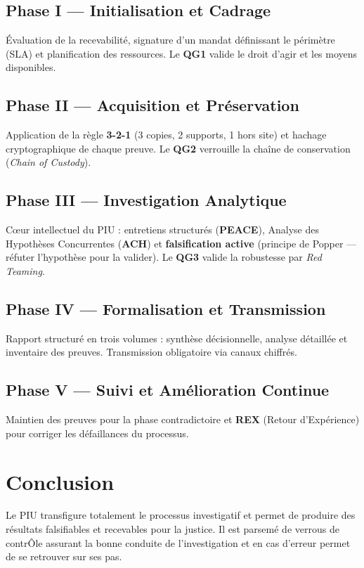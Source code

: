 \subsection{Phase I — Initialisation et Cadrage}
Évaluation de la recevabilité, signature d'un mandat définissant le périmètre (SLA) et planification des ressources. Le \textbf{QG1} valide le droit d'agir et les moyens disponibles.

\subsection{Phase II — Acquisition et Préservation}
Application de la règle \textbf{3-2-1} (3 copies, 2 supports, 1 hors site) et hachage cryptographique de chaque preuve. Le \textbf{QG2} verrouille la chaîne de conservation (\textit{Chain of Custody}).

\subsection{Phase III — Investigation Analytique}
Cœur intellectuel du PIU : entretiens structurés (\textbf{PEACE}), Analyse des Hypothèses Concurrentes (\textbf{ACH}) et \textbf{falsification active} (principe de Popper — réfuter l'hypothèse pour la valider). Le \textbf{QG3} valide la robustesse par \textit{Red Teaming}.

\subsection{Phase IV — Formalisation et Transmission}
Rapport structuré en trois volumes : synthèse décisionnelle, analyse détaillée et inventaire des preuves. Transmission obligatoire via canaux chiffrés.

\subsection{Phase V — Suivi et Amélioration Continue}
Maintien des preuves pour la phase contradictoire et \textbf{REX} (Retour d'Expérience) pour corriger les défaillances du processus.

\section{Conclusion}

Le PIU transfigure totalement le processus investigatif et permet de produire des résultats falsifiables et recevables pour la justice. Il est parsemé de verrous de contrÔle assurant la bonne conduite de l'investigation et en cas d'erreur permet de se retrouver sur ses pas. 